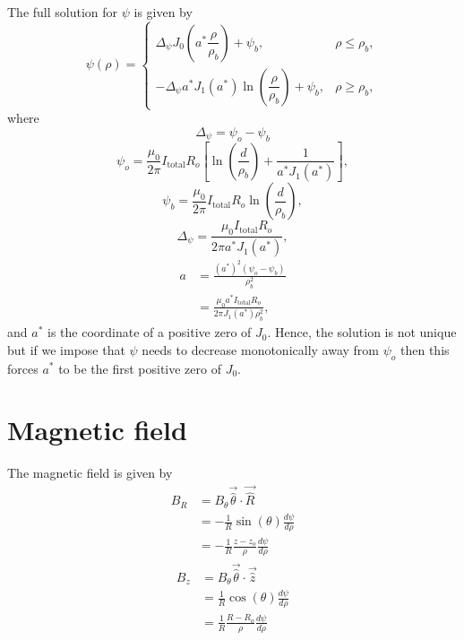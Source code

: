 \documentclass{article}
\begin{document}
The full solution for $\psi$ is given by
\[
\psi(\rho) = \begin{cases}
\Delta_\psi J_0\left(a^*\dfrac{\rho}{\rho_b}\right) + \psi_b, &\rho\le\rho_b, \\
-\Delta_\psi a^*J_1(a^*)\ln\left(\dfrac{\rho}{\rho_b}\right) + \psi_b, & \rho\ge\rho_b,
\end{cases}
\]
where
\[\Delta_\psi = \psi_o - \psi_b\]
\[\psi_o = \frac{\mu_0}{2\pi}I_\text{total}R_o\left[\ln\left(\frac{d}{\rho_b}\right)+\frac{1}{a^*J_1(a^*)}\right],\]
\[\psi_b = \frac{\mu_0}{2\pi}I_\text{total}R_o\ln\left(\frac{d}{\rho_b}\right),\]
\[\Delta_\psi = \frac{\mu_0I_\text{total}R_o}{2\pi a^* J_1(a^*)},\]
\[\begin{aligned}
a &= \frac{(a^*)^2(\psi_o-\psi_b)}{\rho_b^2} \\
&= \frac{\mu_0 a^* I_\text{total}R_o}{2\pi J_1(a^*)\rho_b^2},
\end{aligned}\]
and $a^*$ is the coordinate of a positive zero of $J_0$. Hence, the solution is not unique but if we impose that $\psi$ needs to decrease monotonically away from $\psi_o$ then this forces $a^*$ to be the first positive zero of $J_0$.


\section{Magnetic field}

The magnetic field is given by
\[\begin{aligned} 
    B_R &= B_\theta \vec{\hat{\theta}}\cdot \vec{\hat{R}} \\
    &= -\frac{1}{R}\sin(\theta) \frac{d\psi}{d\rho} \\
    &= -\frac{1}{R}\frac{z - z_o}{\rho}\frac{d\psi}{d\rho}
\end{aligned}\]
\[\begin{aligned} 
B_z &= B_\theta \vec{\hat{\theta}}\cdot \vec{\hat{z}} \\
&= \frac{1}{R}\cos(\theta)\frac{d\psi}{d\rho} \\
&= \frac{1}{R}\frac{R-R_o}{\rho}\frac{d\psi}{d\rho}
\end{aligned}\]
\end{document}
